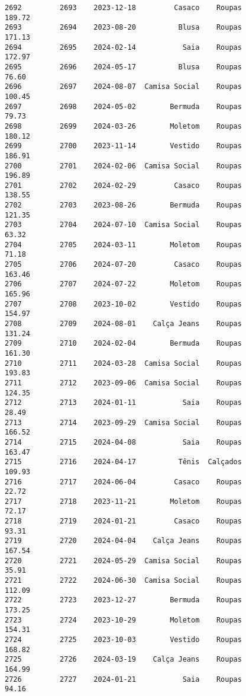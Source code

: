 \documentclass[11pt]{article}
\begin{document}
\begin{Verbatim}[commandchars=\\\{\}]
2692         2693    2023-12-18         Casaco    Roupas          189.72   
2693         2694    2023-08-20          Blusa    Roupas          171.13   
2694         2695    2024-02-14           Saia    Roupas          172.97   
2695         2696    2024-05-17          Blusa    Roupas           76.60   
2696         2697    2024-08-07  Camisa Social    Roupas          100.45   
2697         2698    2024-05-02        Bermuda    Roupas           79.73   
2698         2699    2024-03-26        Moletom    Roupas          180.12   
2699         2700    2023-11-14        Vestido    Roupas          186.91   
2700         2701    2024-02-06  Camisa Social    Roupas          196.89   
2701         2702    2024-02-29         Casaco    Roupas          138.55   
2702         2703    2023-08-26        Bermuda    Roupas          121.35   
2703         2704    2024-07-10  Camisa Social    Roupas           63.32   
2704         2705    2024-03-11        Moletom    Roupas           71.18   
2705         2706    2024-07-20         Casaco    Roupas          163.46   
2706         2707    2024-07-22        Moletom    Roupas          165.96   
2707         2708    2023-10-02        Vestido    Roupas          154.97   
2708         2709    2024-08-01    Calça Jeans    Roupas          131.24   
2709         2710    2024-02-04        Bermuda    Roupas          161.30   
2710         2711    2024-03-28  Camisa Social    Roupas          193.83   
2711         2712    2023-09-06  Camisa Social    Roupas          124.35   
2712         2713    2024-01-11           Saia    Roupas           28.49   
2713         2714    2023-09-29  Camisa Social    Roupas          166.52   
2714         2715    2024-04-08           Saia    Roupas          163.47   
2715         2716    2024-04-17          Tênis  Calçados          109.93   
2716         2717    2024-06-04         Casaco    Roupas           22.72   
2717         2718    2023-11-21        Moletom    Roupas           72.17   
2718         2719    2024-01-21         Casaco    Roupas           93.31   
2719         2720    2024-04-04    Calça Jeans    Roupas          167.54   
2720         2721    2024-05-29  Camisa Social    Roupas           35.91   
2721         2722    2024-06-30  Camisa Social    Roupas          112.09   
2722         2723    2023-12-27        Bermuda    Roupas          173.25   
2723         2724    2023-10-29        Moletom    Roupas          154.31   
2724         2725    2023-10-03        Vestido    Roupas          168.82   
2725         2726    2024-03-19    Calça Jeans    Roupas          164.99   
2726         2727    2024-01-21           Saia    Roupas           94.16   

\end{Verbatim}
\end{document}
